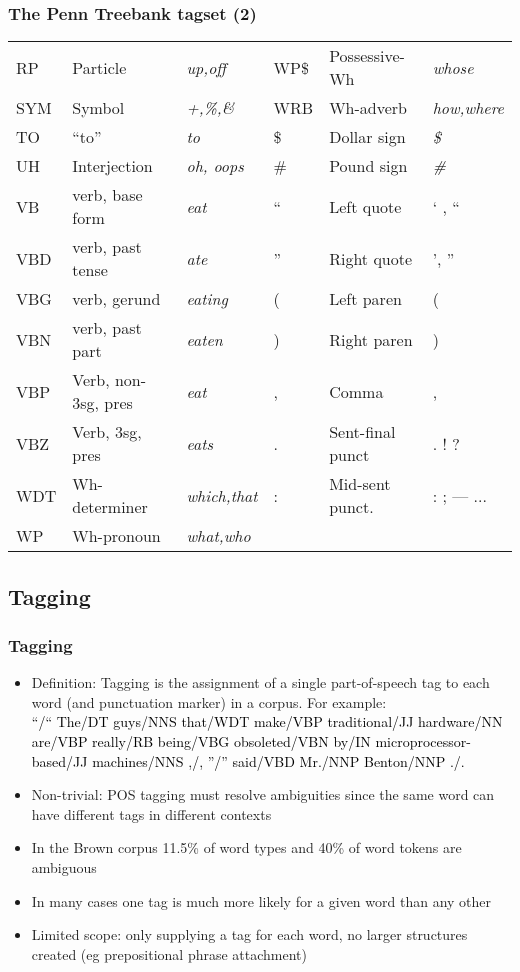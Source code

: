 \documentclass{beamer}             %
\begin{document}
\begin{frame}
  \frametitle{The Penn Treebank tagset (2)}
  {\footnotesize
    \begin{tabular}{|lll|lll|}
      \hline
      RP & Particle & \emph{up,off} &
      WP\$ & Possessive-Wh & \emph{whose} \\ 
      SYM & Symbol & \emph{+,\%,\&}  &
      WRB & Wh-adverb & \emph{how,where} \\
      TO & ``to'' & \emph{to} &
      \$ & Dollar sign & \emph{\$}\\
      UH & Interjection & \emph{oh, oops} &
      \# & Pound sign & \emph{\#} \\
      VB & verb, base form &     \emph{eat} &
      `` & Left quote & ` , `` \\
      VBD & verb, past tense & \emph{ate} &
      '' & Right quote & ', '' \\
      VBG & verb, gerund & \emph{eating} &
      ( & Left paren & ( \\
      VBN & verb, past part & \emph{eaten} &
      ) & Right paren & ) \\
      VBP & Verb, non-3sg, pres & \emph{eat} &
      , & Comma & , \\
      VBZ & Verb, 3sg, pres & \emph{eats} &
      . & Sent-final punct & . ! ? \\
      WDT & Wh-determiner &  \emph{which,that} &
      : & Mid-sent punct. & : ; --- ... \\
      WP & Wh-pronoun & \emph{what,who} & & & \\
      \hline
    \end{tabular}
  }
\end{frame}

\subsection{Tagging}

\begin{frame}
  \frametitle{Tagging}
  \begin{itemize}
  \item Definition: Tagging is the assignment of a single
    part-of-speech tag to each word (and punctuation marker) in a
    corpus.  For example:\\
    {\scriptsize
    \textcolor{black}{``/``  The/DT  guys/NNS  that/WDT  make/VBP
      traditional/JJ  hardware/NN  are/VBP  really/RB  being/VBG
      obsoleted/VBN  by/IN  microprocessor-based/JJ  machines/NNS  ,/,
      ''/''  said/VBD  Mr./NNP  Benton/NNP  ./.}}
  \item Non-trivial: POS tagging must resolve ambiguities since the
    same word can have different tags in different contexts
  \item In the Brown corpus 11.5\% of word types and 40\% of word
    tokens are ambiguous
  \item In many cases one tag is much more likely for a given word
    than any other
  \item Limited scope: only supplying a tag for each word, no larger
    structures created (eg prepositional phrase attachment)
  \end{itemize}  
\end{frame}
\end{document}
